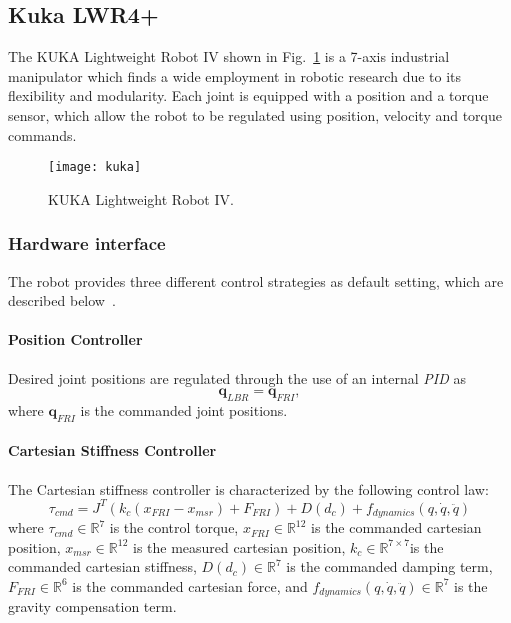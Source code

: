 \subsection{Kuka LWR4+}
\label{sec:kuka}

The KUKA Lightweight Robot IV shown in Fig.~\ref{fig:kuka_arm} is a 7-axis industrial manipulator which finds a wide employment in robotic research due to its flexibility and modularity.
Each joint is equipped with a position and a torque sensor, which allow the robot to be regulated using position, velocity and torque commands.
\begin{figure}
\centering
\texttt{[image: kuka]}
\caption{KUKA Lightweight Robot IV.}
\label{fig:kuka_arm}
\end{figure}

\subsubsection{Hardware interface}
The robot provides three different control strategies as default setting, which are described below~\cite{kukafri}.

\paragraph{Position Controller}
Desired joint positions are regulated through the use of an internal \textit{PID} as
\begin{equation}
\mathbf{q}_{LBR} = \mathbf{q}_{FRI},
\label{eq:positioncontroller}
\end{equation}
where $\mathbf{q}_{FRI}$ is the commanded joint positions.

\paragraph{Cartesian Stiffness Controller}
The Cartesian stiffness controller is characterized by the following control law:
\begin{equation}
\tau_{cmd} = J^T(k_c(x_{FRI} - x_{msr}) + F_{FRI}) + D(d_c) + f_{dynamics}(q,\dot{q},\ddot{q})
\label{eq:cartesianstiffnesscontroller}
\end{equation}
where $\tau_{cmd}\in\mathbb{R}^7$ is the  control torque, $x_{FRI}\in\mathbb{R}^{12}$ is the commanded cartesian position, $x_{msr}\in\mathbb{R}^{12}$ is the measured cartesian position, $k_c\in\mathbb{R}^{7\times 7}$is the commanded cartesian stiffness, $D(d_c)\in\mathbb{R}^7$ is the commanded damping term, $F_{FRI}\in\mathbb{R}^6$ is the commanded cartesian force, and $f_{dynamics}(q,\dot{q},\ddot{q})\in\mathbb{R}^7$ is the gravity compensation term.

